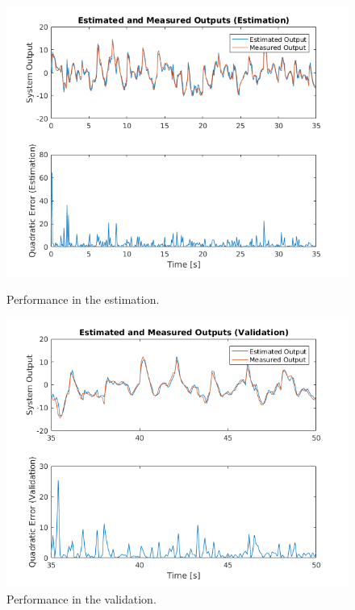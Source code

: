 \documentclass[12pt]{article}
\begin{document}
\begin{figure}[H]
	\centering
	\begin{minipage}{.5\textwidth}
		\centering
		\includegraphics[keepaspectratio=true, scale=0.3]{images/arx2_performance_estimation.png}
		\caption{Performance in the estimation.}
		\label{arx2_performance_estimation}
	\end{minipage}%
	\begin{minipage}{.5\textwidth}
		\centering
		\includegraphics[keepaspectratio=true, scale=0.3]{images/arx2_performance_validation.png}
		\caption{Performance in the validation.}
		\label{arx2_performance_validation}
	\end{minipage}
\end{figure}
\end{document}
